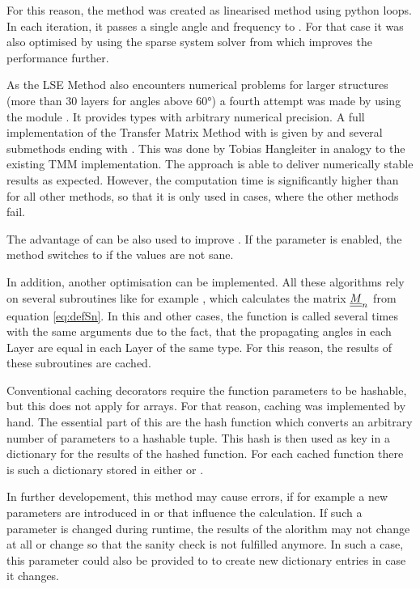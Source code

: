 For this reason, the method  was created as linearised
method using python loops. In each iteration, it passes a single angle and
frequency to . For that case it was also optimised by using
the sparse system solver  from  which
improves the performance further.

As the LSE Method also encounters numerical problems for larger structures
(more than 30 layers for angles above $\ang{60}$) a
fourth attempt was made by using the module . It provides
types with arbitrary numerical precision. A full implementation of the Transfer
Matrix Method with  is given by  and
several submethods ending with . This was done by Tobias Hangleiter in
analogy to the existing TMM implementation.
The  approach is able to deliver numerically stable results as
expected. However, the computation time is significantly higher than for all
other methods, so that it is only used in cases, where the other methods fail.

The advantage of  can be also used to improve
. If the parameter  is enabled, the
method switches to  if the values are not sane.

In addition, another optimisation can be implemented. All these algorithms rely
on several subroutines like for example , which
calculates the matrix $\underline{\underline{M}}_n$ from equation \ref{eq:defSn}. In this and
other cases, the function is called several times with the same arguments due
to the fact, that the propagating angles in each Layer are equal in each Layer
of the same type. For this reason, the results of these subroutines are cached.

Conventional caching decorators require the function parameters to be
hashable, but this does not apply for  arrays. For that reason,
caching was implemented by hand. The essential part of this are the hash
function  which converts an arbitrary number of parameters to a
hashable tuple. This hash is then used as key in a dictionary for the results
of the
hashed function. For each cached function there is such a dictionary stored in
either  or .

In further developement, this method may cause errors, if for example a new
parameters are introduced in  or  that influence the
calculation. If such a parameter is changed during runtime, the results of the
alorithm may not change at all or change so that the sanity check is not
fulfilled anymore. In such a case, this parameter could also be provided to
 to create new dictionary entries in case it changes.

